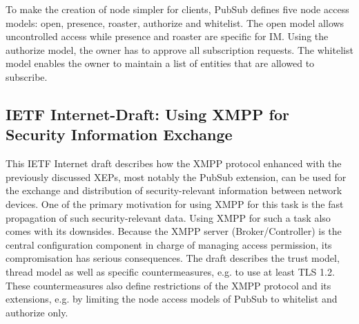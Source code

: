 To make the creation of node simpler for clients, PubSub defines five node access models: open, presence, roaster, authorize and whitelist.
The open model allows uncontrolled access while presence and roaster are specific for IM. Using the authorize model, the owner has to approve all subscription requests. The whitelist model enables the owner to maintain a list of entities that are allowed to subscribe. 

\subsection{IETF Internet-Draft: Using XMPP for Security Information Exchange}

This IETF Internet draft describes how the XMPP protocol enhanced with the previously discussed XEPs, most notably the PubSub extension, can be used for the exchange and distribution of security-relevant information between network devices. One of the primary motivation for using XMPP for this task is the fast propagation of such security-relevant data. Using XMPP for such a task also comes with its downsides. Because the XMPP server (Broker/Controller) is the central configuration component in charge of managing access permission, its compromisation has serious consequences. The draft describes the trust model, thread model as well as specific countermeasures, e.g. to use at least TLS 1.2. These countermeasures also define restrictions of the XMPP protocol and its extensions, e.g. by limiting the node access models of PubSub to whitelist and authorize only.\cite{ietf-mile-xmpp-grid-05}

